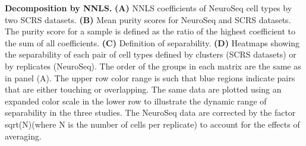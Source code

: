 \textbf{Decomposition by NNLS.}
\textbf{(A)} NNLS coefficients of NeuroSeq cell types by two SCRS datasets.
\textbf{(B)} Mean purity scores for NeuroSeq and SCRS datasets. The purity score for a sample is defined as the ratio of the highest coefficient to the sum of all coefficients.
\textbf{(C)} Definition of separability.
\textbf{(D)} Heatmaps showing the separability of each pair of cell types defined by clusters (SCRS datasets) or by replicates (NeuroSeq). The order of the groups in each matrix are the same as in panel (A). The upper row color range is such that blue regions indicate pairs that are either touching or overlapping. The same data are plotted using an expanded color scale in the lower row to illustrate the dynamic range of separability in the three studies. The NeuroSeq data are corrected by the factor sqrt(N)(where N is the number of cells per replicate) to account for the effects of averaging.